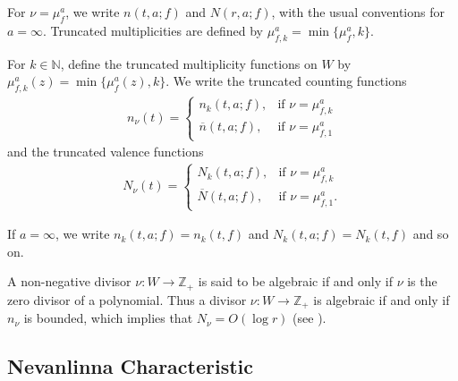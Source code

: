 \documentclass[11pt,reqno]{amsart}
\newcommand{\ol}{\overline}
\newcommand{\beas}{\begin{eqnarray*}}
\newcommand{\eeas}{\end{eqnarray*}}
\numberwithin{equation}{section}
\begin{document}
For $\nu=\mu_f^a$, we write $n(t,a;f)$ and $N(r,a;f)$, with the usual conventions for $a=\infty$.  
Truncated multiplicities are defined by $\mu_{f,k}^a=\min\{\mu_f^a,k\}$.
\vspace{1.2mm}

For $k\in\mathbb{N}$, define the truncated multiplicity functions on $W$ by $\mu_{f,k}^a(z)=\min\{\mu_f^a(z),k\}$.
We write the truncated counting functions 
\beas n_{\nu}(t)=\begin{cases}
n_k(t,a;f), &\text{if $\nu=\mu_{f,k}^a$}\\
\ol n(t,a;f), &\text{if $\nu=\mu_{f,1}^a$}
\end{cases}\eeas
and the truncated valence functions
\beas N_{\nu}(t)=\begin{cases}
N_k(t,a;f), &\text{if $\nu=\mu_{f,k}^a$}\\
\ol N(t,a;f), &\text{if $\nu=\mu_{f,1}^a$}.
\end{cases}\eeas

If $a=\infty$, we write $n_k(t,a;f)=n_k(t,f)$ and $N_k(t,a;f)=N_k(t,f)$
and so on.\par
A non-negative divisor $\nu:W\to \mathbb{Z}_+$ is said to be algebraic if and only if $\nu$ is  the zero divisor of a polynomial. Thus a divisor $\nu:W\to \mathbb{Z}_+$ is algebraic if and only if $n_{\nu}$ is bounded, which implies that $N_{\nu}=O(\log r)$ (see \cite[pp. 19]{Stoll-1974}).

\subsection*{Nevanlinna Characteristic}
\end{document}
